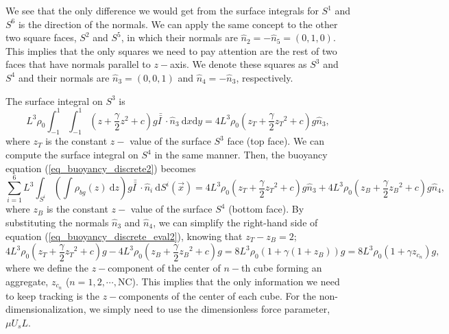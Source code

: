We see that the only difference we would get from the surface integrals for $S^1$ and $S^6$ is the direction of the normals. We can apply the same concept to the other two square faces, $S^2$ and $S^5$, in which their normals are $\hat{n}_2 = -\hat{n}_5 = (0,1,0)$. This implies that the only squares we need to pay attention are the rest of two faces that have normals parallel to $z-$axis. We denote these squares as $S^3$ and $S^4$ and their normals are $\hat{n}_3 = (0,0,1)$ and $\hat{n}_4 = -\hat{n}_{3}$, respectively. 
\par
The surface integral on $S^3$ is 
\[ L^3
\rho_0\int_{-1}^{1} \int_{-1}^{1}
  	\left( 
  	 z + \frac{\gamma}{2}{z}^2 + c 
 	\right)g  \bar{\bar{I \ }}  \cdot
 	\hat{n}_3 \ 
	\textrm{d}x  \textrm{d}y 
	= 4 L^3 \rho_0 \left( z_T + \frac{\gamma}{2} {z_T}^{2} +c \right) g \hat{n}_3,
\]
where $z_T$ is the constant $z-$ value of the surface $S^3$ face (top face).
We can compute the surface integral on $S^4$ in the same manner. Then, the buoyancy equation (\ref{eq_buoyancy_discrete2}) becomes
\begin{equation}
	\sum_{i=1}^{6} L^3
	 \int_{S^i} \left( 
	   \int  {\rho_{bg}} (z)  \ \textrm{d}z 
	 \right) g \bar{\bar{I \ }}  \cdot
	\hat{n}_i \ \textrm{d}S^i (\vec{x})
	= 4 L^3 \rho_0 \left( z_T + \frac{\gamma}{2} {z_T}^{2} +c \right) g \hat{n}_3
	+ 4L^3 \rho_0 \left( z_B + \frac{\gamma}{2} {z_B}^{2} + c \right) g \hat{n}_4,
\label{eq_buoyancy_discrete_eval2}
\end{equation}
where $z_B$ is the constant $z-$ value of the surface $S^4$ (bottom face). By substituting the normals $\hat{n}_3$ and $\hat{n}_4$, we can simplify the right-hand side of equation (\ref{eq_buoyancy_discrete_eval2}), knowing that $z_T - z_B = 2$;
\begin{equation}
4 L^3 \rho_0 \left( z_T + \frac{\gamma}{2} {z_T}^{2} + c \right) g 
	- 4 L^3 \rho_0 \left( z_B + \frac{\gamma}{2} {z_B}^{2} + c \right) g
= 8 L^3 \rho_0 \left( 1+ \gamma (1+z_B) \right)g
= 8 L^3 \rho_0 \left( 1+ \gamma z_{c_n} \right) g , 
\label{eq_buoyancy_z_eval2}
\end{equation}
where we define the $z-$component of the center of $n-$th cube forming an aggregate, $z_{c_n}$ ($ n = 1, 2, \cdots, $NC).
 This implies that the only information we need to keep tracking is the $z-$components of the center of each cube. For the non-dimensionalization, we simply need to use the dimensionless force parameter, $\mu U_s L$.


